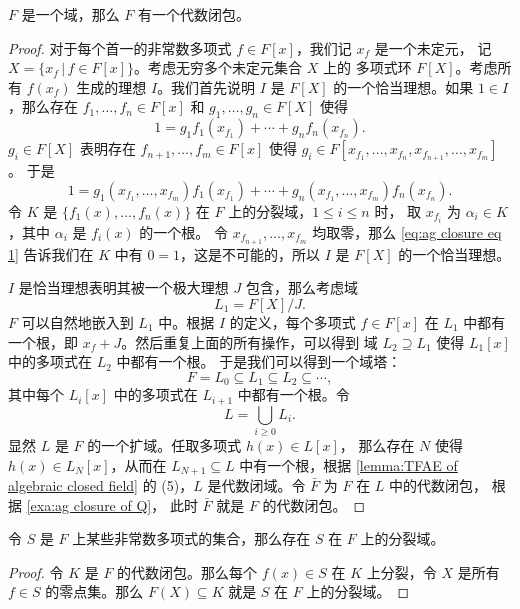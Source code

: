 \begin{theorem}
  $F$ 是一个域，那么 $F$ 有一个代数闭包。
\end{theorem}
\begin{proof}
  对于每个首一的非常数多项式 $f\in F[x]$，我们记 $x_f$ 是一个未定元，
  记 $X=\{x_f\,|\, f\in F[x]\}$。考虑无穷多个未定元集合 $X$ 上的
  多项式环 $F[X]$。考虑所有 $f(x_f)$ 生成的理想 $I$。我们首先说明 $I$
  是 $F[X]$ 的一个恰当理想。如果 $1\in I$，那么存在 $f_1,\dots,f_n\in F[x]$
  和 $g_1,\dots,g_n\in F[X]$ 使得
  \[
    1=g_1f_1(x_{f_1})+\cdots+g_nf_n(x_{f_n}). 
  \]
  $g_i\in F[X]$ 表明存在 $f_{n+1},\dots,f_m\in F[x]$ 使得
  $g_i\in F[x_{f_1},\dots,x_{f_n},x_{f_{n+1}},\dots,x_{f_m}]$。
  于是 
  \begin{equation}\label{eq:ag closure eq 1}
    1=g_1(x_{f_1},\dots,x_{f_m})f_1(x_{f_1})+\cdots+  
    g_n(x_{f_1},\dots,x_{f_m})f_n(x_{f_n}).
  \end{equation}
  令 $K$ 是 $\{f_1(x),\dots,f_n(x)\}$ 在 $F$ 上的分裂域，$1\leq i\leq n$ 时，
  取 $x_{f_i}$ 为 $\alpha_i\in K$，其中 $\alpha_i$ 是 $f_i(x)$ 的一个根。
  令 $x_{f_{n+1}},\dots,x_{f_m}$ 均取零，那么 \eqref{eq:ag closure eq 1}
  告诉我们在 $K$ 中有 $0=1$，这是不可能的，所以 $I$ 是 $F[X]$ 的一个恰当理想。

  $I$ 是恰当理想表明其被一个极大理想 $J$ 包含，那么考虑域
  \[
    L_1=F[X]/J.  
  \]
  $F$ 可以自然地嵌入到 $L_1$ 中。根据 $I$ 的定义，每个多项式 $f\in F[x]$
  在 $L_1$ 中都有一个根，即 $x_f+J$。然后重复上面的所有操作，可以得到
  域 $L_2\supseteq L_1$ 使得 $L_1[x]$ 中的多项式在 $L_2$ 中都有一个根。
  于是我们可以得到一个域塔：
  \[
    F=L_0\subseteq L_1\subseteq L_2\subseteq \cdots,  
  \]
  其中每个 $L_i[x]$ 中的多项式在 $L_{i+1}$ 中都有一个根。令
  \[
    L=\bigcup_{i\geq 0}L_i.  
  \]
  显然 $L$ 是 $F$ 的一个扩域。任取多项式 $h(x)\in L[x]$，
  那么存在 $N$ 使得 $h(x)\in L_N[x]$，从而在 $L_{N+1}\subseteq L$
  中有一个根，根据 \autoref{lemma:TFAE of algebraic closed field}
  的 (5)，$L$ 是代数闭域。令 $\bar F$ 为 $F$ 在 $L$ 中的代数闭包，
  根据 \autoref{exa:ag closure of Q}，
  此时 $\bar F$ 就是 $F$ 的代数闭包。
\end{proof}

\begin{corollary}
  令 $S$ 是 $F$ 上某些非常数多项式的集合，那么存在 $S$ 在 $F$ 上的分裂域。
\end{corollary}
\begin{proof}
  令 $K$ 是 $F$ 的代数闭包。那么每个 $f(x)\in S$ 在 $K$ 上分裂，令 $X$
  是所有 $f\in S$ 的零点集。那么 $F(X)\subseteq K$ 就是 $S$ 在 $F$ 上的分裂域。
\end{proof}

